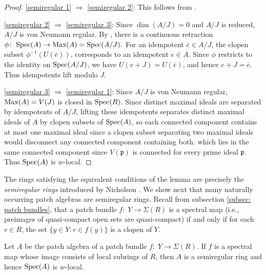 \documentclass[11pt]{amsart}
\begin{document}
\begin{proof}
\ref{semiregular 1} $\Rightarrow$ \ref{semiregular 2}: This follows from \cite[Lemma~2.1.4]{BhattScholze}.

\ref{semiregular 2} $\Rightarrow$ \ref{semiregular 3}: Since $\dim(A/J) =0$ and $A/J$ is reduced, $A/J$ is von Neumann regular. By \cite[Theorem~1.2]{DeMarcoOrsatti}, there is a continuous retraction $\phi\colon\; \mbox{\rm Spec}(A)\rightarrow \mbox{\rm Max}(A)=\mbox{\rm Spec}(A/J).$
For an idempotent $\bar e\in A/J$, the clopen subset $\phi^{-1}(U(\bar e))$,  corresponds to an idempotent $e\in A$. Since $\phi$ restricts to the identity on $\mbox{\rm Spec}(A/J)$, we have $U(e+J)=U(\bar e)$, and hence $e+J=\bar e$. Thus idempotents lift modulo $J$.

\ref{semiregular 3} $\Rightarrow$ \ref{semiregular 1}: Since $A/J$ is von Neumann regular, $\mbox{\rm Max}(A)=V(J)$ is closed in $\mbox{\rm Spec}(R)$. Since distinct maximal ideals are separated by idempotents of $A/J$,  lifting these idempotents separates distinct maximal ideals of $A$ by clopen subsets of $\mbox{\rm Spec}(A)$, so each connected component contains at most one maximal ideal since a clopen subset separating two maximal ideals would disconnect any connected component containing both.
which lies in the same connected component since $V(\mathfrak p)$ is connected for every prime
ideal $\mathfrak p$. Thus $\mbox{\rm Spec}(A)$ is $w$-local.
\end{proof} 

The rings satisfying the equivalent conditions of the lemma are precisely
the {\it semiregular rings} introduced by Nicholson \cite[Theorem~2.9]{Nicholson1976}.
We show next that many naturally occurring patch algebras are semiregular rings. Recall from subsection \ref{subsec: patch bundles}, that a patch bundle $f\colon\; Y \rightarrow \Sigma(R)$ is a spectral map (i.e., preimages of quasi-compact open sets are quasi-compact) if and only if for each $r \in R$, the set $\{y \in Y:r \in f(y)\}$ is a clopen of $Y$.


\begin{proposition} Let  $A$ be the patch algebra of a patch bundle $f\colon\; Y \rightarrow \Sigma(R)$. If $f$ is a spectral map whose image consists of local subrings of $R$, then $A$ is a semiregular ring and hence $\mbox{\rm Spec}(A)$ is $w$-local. 
\end{proposition}
\end{document}
